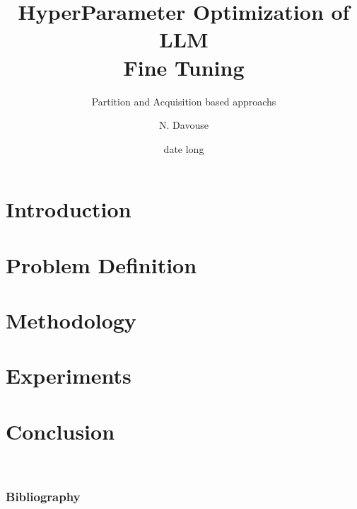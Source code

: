 \documentclass[A4,svgnames,9pt,aspectratio=169]{beamer}
\title[titrecourt]{HyperParameter Optimization of LLM \\ Fine Tuning}
\subtitle{Partition and Acquisition based approachs}
\date[12/11/2024]{date long}
\author[A. et al.]{N. Davouse}
\begin{document}

\frame{\titlepage}


\renewcommand{\contentsname}{Sommaire}



\frame{\tocpage}

\section{Introduction}
\frame{\sectionpage}


\section{Problem Definition}
\frame{\sectionpage}


\section{Methodology}
\frame{\sectionpage}


\section{Experiments}
\frame{\sectionpage}



\section{Conclusion}


\
\begin{frame}
\frametitle{Bibliography}
\printbibliography
\nocite{*}
\end{frame}







\renewcommand{\thankyou}{Thank You.}
\frame{\merci}

\end{document}
